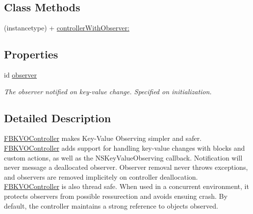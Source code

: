 \subsection*{Class Methods}
\begin{DoxyCompactItemize}
\item 
(instancetype) + \hyperlink{interface_f_b_k_v_o_controller_acf4f217b04970278e14b461830db508e}{controller\+With\+Observer\+:}
\end{DoxyCompactItemize}
\subsection*{Properties}
\begin{DoxyCompactItemize}
\item 
\hypertarget{interface_f_b_k_v_o_controller_a9a41b9bcda267b904af88265fa4c3611}{id \hyperlink{interface_f_b_k_v_o_controller_a9a41b9bcda267b904af88265fa4c3611}{observer}}\label{interface_f_b_k_v_o_controller_a9a41b9bcda267b904af88265fa4c3611}

\begin{DoxyCompactList}\small\item\em The observer notified on key-\/value change. Specified on initialization. \end{DoxyCompactList}\end{DoxyCompactItemize}


\subsection{Detailed Description}
\hyperlink{interface_f_b_k_v_o_controller}{F\+B\+K\+V\+O\+Controller} makes Key-\/\+Value Observing simpler and safer.  \hyperlink{interface_f_b_k_v_o_controller}{F\+B\+K\+V\+O\+Controller} adds support for handling key-\/value changes with blocks and custom actions, as well as the N\+S\+Key\+Value\+Observing callback. Notification will never message a deallocated observer. Observer removal never throws exceptions, and observers are removed implicitely on controller deallocation. \hyperlink{interface_f_b_k_v_o_controller}{F\+B\+K\+V\+O\+Controller} is also thread safe. When used in a concurrent environment, it protects observers from possible ressurection and avoids ensuing crash. By default, the controller maintains a strong reference to objects observed. 

